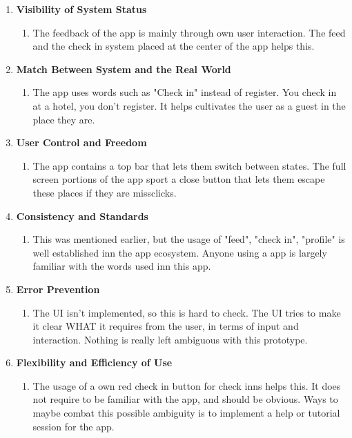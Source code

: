 \documentclass[12pt]{article}
\begin{document}
\begin{enumerate}
  \item \textbf{Visibility of System Status}
    \begin{enumerate}
      \item [] The feedback of the app is mainly through own user interaction.
        The feed and the check in system placed at the center of the app helps
        this.
    \end{enumerate}

  \item \textbf{Match Between System and the Real World}
    \begin{enumerate}
      \item[] The app uses words such as "Check in" instead of register. You
        check in at a hotel, you don't register. It helps cultivates the user as
        a guest in the place they are.
    \end{enumerate}

  \item \textbf{User Control and Freedom}
    \begin{enumerate}
      \item[] The app contains a top bar that lets them switch between states.
        The full screen portions of the app sport a close button that lets them
        escape these places if they are missclicks.
    \end{enumerate}


  \item \textbf{Consistency and Standards}
    \begin{enumerate}
      \item[] This was mentioned earlier, but the usage of "feed", "check in",
        "profile" is well established inn the app ecosystem. Anyone using a app
        is largely familiar with the words used inn this app.
    \end{enumerate}

  \item \textbf{Error Prevention}
    \begin{enumerate}
      \item[] The UI isn't implemented, so this is hard to check. The UI tries
        to make it clear WHAT it requires from the user, in terms of input and
        interaction. Nothing is really left ambiguous with this prototype.
    \end{enumerate}

  \item \textbf{Flexibility and Efficiency of Use}
    \begin{enumerate}
      \item[] The usage of a own red check in button for check inns helps this.
        It does not require to be familiar with the app, and should be obvious.
        Ways to maybe combat this possible ambiguity is to implement a help or
        tutorial session for the app.
    \end{enumerate}


\end{enumerate}
\end{document}
